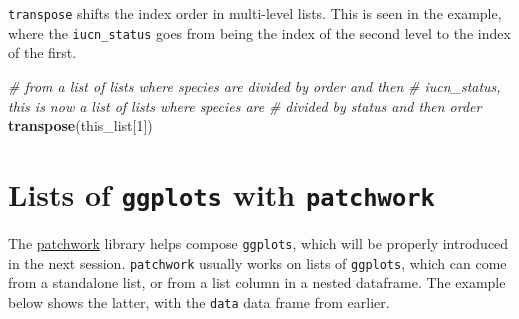 \documentclass[]{book}
\newenvironment{Shaded}{}{}
\newcommand{\CommentTok}[1]{\textcolor[rgb]{0.38,0.63,0.69}{\textit{#1}}}
\newcommand{\ControlFlowTok}[1]{\textcolor[rgb]{0.00,0.44,0.13}{\textbf{#1}}}
\newcommand{\DecValTok}[1]{\textcolor[rgb]{0.25,0.63,0.44}{#1}}
\newcommand{\KeywordTok}[1]{\textcolor[rgb]{0.00,0.44,0.13}{\textbf{#1}}}
\newcommand{\NormalTok}[1]{#1}
\newcommand{\OperatorTok}[1]{\textcolor[rgb]{0.40,0.40,0.40}{#1}}
\newcommand{\StringTok}[1]{\textcolor[rgb]{0.25,0.44,0.63}{#1}}
\begin{document}
\texttt{transpose} shifts the index order in multi-level lists. This is seen in the example, where the \texttt{iucn\_status} goes from being the index of the second level to the index of the first.

\begin{Shaded}
\end{Shaded}

\begin{Shaded}
\begin{Highlighting}[]
\CommentTok{# from a list of lists where species are divided by order and then}
\CommentTok{# iucn_status, this is now a list of lists where species are }
\CommentTok{# divided by status and then order}
\KeywordTok{transpose}\NormalTok{(this_list[}\DecValTok{1}\NormalTok{])}
\end{Highlighting}
\end{Shaded}

\hypertarget{lists-of-ggplots-with-patchwork}{%
\section{\texorpdfstring{Lists of \texttt{ggplots} with \texttt{patchwork}}{Lists of ggplots with patchwork}}\label{lists-of-ggplots-with-patchwork}}

The \href{https://patchwork.data-imaginist.com/}{patchwork} library helps compose \texttt{ggplots}, which will be properly introduced in the next session. \texttt{patchwork} usually works on lists of \texttt{ggplots}, which can come from a standalone list, or from a list column in a nested dataframe.
The example below shows the latter, with the \texttt{data} data frame from earlier.

\begin{Shaded}
\end{Shaded}
\end{document}
